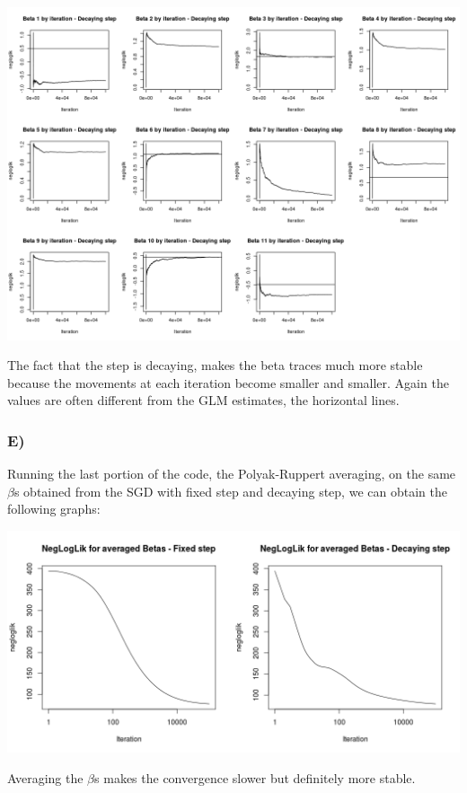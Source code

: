 \documentclass{article}
\begin{document}
\includegraphics[width=\textwidth]{Rplot_beta_traces2.png}

The fact that the step is decaying, makes the beta traces much more stable because the movements at each iteration become smaller and smaller. Again the values are often different from the GLM estimates, the horizontal lines.

\subsubsection*{E)}

Running the last portion of the code, the Polyak-Ruppert averaging, on the same $\beta$s obtained from the SGD with fixed step and decaying step, we can obtain the following graphs:

\includegraphics[width=\textwidth]{Rplot_negloglik_avg_beta.png}

Averaging the $\beta$s makes the convergence slower but definitely more stable.

\newpage
\end{document}
